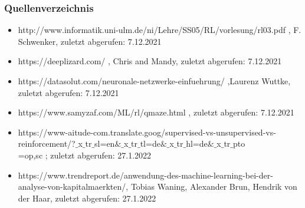 \documentclass{beamer}
\begin{document}
\begin{frame}%
\frametitle{Quellenverzeichnis}
\begin{itemize}
\item \alert{http://www.informatik.uni-ulm.de/ni/Lehre/SS05/RL/vorlesung/rl03.pdf} , F. Schwenker, zuletzt abgerufen: 7.12.2021
\item \alert{https://deeplizard.com/} , Chris and Mandy, zuletzt abgerufen: 7.12.2021
\item \alert{https://datasolut.com/neuronale-netzwerke-einfuehrung/} ,Laurenz Wuttke, zuletzt abgerufen: 7.12.2021
\item \alert{https://www.samyzaf.com/ML/rl/qmaze.html} , zuletzt abgerufen: 7.12.2021
\item \alert {https://www-aitude-com.translate.goog/supervised-vs-unsupervised-vs-reinforcement/?$\_$x$\_$tr$\_$sl=en$\& \_$x$\_$tr$\_$tl=de$\& \_$x$\_$tr$\_$hl=de$\& \_$x$\_$tr$\_$pto\\=op,sc} ; zuletzt abgerufen: 27.1.2022
\item \alert {https://www.trendreport.de/anwendung-des-machine-learning-bei-der-analyse-von-kapitalmaerkten/}, Tobias Waning, Alexander Brun, Hendrik von der Haar, zuletzt abgerufen: 27.1.2022
\end{itemize}
\end{frame}
\end{document}
